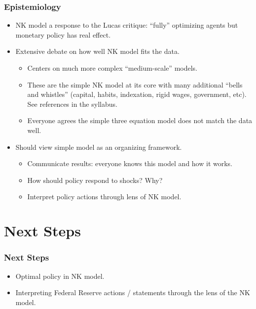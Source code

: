 \documentclass[english,xcolor=svgnames]{beamer}
\begin{document}
\begin{frame}
\frametitle{Epistemiology}
\begin{itemize}
	\item NK model a response to the Lucas critique: ``fully'' optimizing agents but monetary policy has real effect.
	\item Extensive debate on how well NK model fits the data.
	\begin{itemize}
		\item Centers on much more complex ``medium-scale'' models.
		\item These are the simple NK model at its core with many additional ``bells and whistles'' (capital, habits, indexation, rigid wages, government, etc).  See references in the syllabus.
		\item Everyone agrees the simple three equation model does not match the data well.
	\end{itemize}
	\item Should view simple model as an organizing framework.
	\begin{itemize}
		\item Communicate results: everyone knows this model and how it works.
		\item How should policy respond to shocks? Why?
		\item Interpret policy actions through lens of NK model.
	\end{itemize}
\end{itemize}
\end{frame}

\section{Next Steps}


\begin{frame}
\frametitle{Next Steps}
\begin{itemize}
	\item Optimal policy in NK model.
	\item Interpreting Federal Reserve actions / statements through the lens of the NK model.
\end{itemize}
\end{frame}
\end{document}
